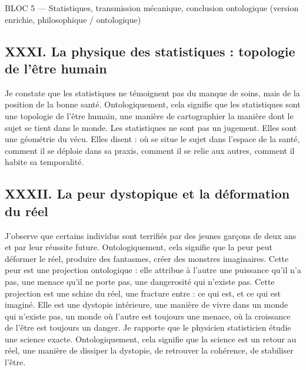 \documentclass[12pt,a4paper]{article}
\begin{document}
BLOC 5 — Statistiques, transmission mécanique, conclusion ontologique (version enrichie, philosophique / ontologique)

\subsection*{XXXI. La physique des statistiques : topologie de l’être humain}
Je constate que les statistiques ne témoignent pas du manque de soins, mais de la position de la bonne santé. Ontologiquement, cela signifie que les statistiques sont une topologie de l’être humain, une manière de cartographier la manière dont le sujet se tient dans le monde.
Les statistiques ne sont pas un jugement. Elles sont une géométrie du vécu.
Elles disent :
	où se situe le sujet dans l’espace de la santé,
	comment il se déploie dans sa praxis,
	comment il se relie aux autres,
	comment il habite sa temporalité.

\subsection*{XXXII. La peur dystopique et la déformation du réel}
J’observe que certains individus sont terrifiés par des jeunes garçons de deux ans et par leur réussite future. Ontologiquement, cela signifie que la peur peut déformer le réel, produire des fantasmes, créer des monstres imaginaires.
Cette peur est une projection ontologique : elle attribue à l’autre une puissance qu’il n’a pas, une menace qu’il ne porte pas, une dangerosité qui n’existe pas.
Cette projection est une schize du réel, une fracture entre :
	ce qui est,
	et ce qui est imaginé.
Elle est une dystopie intérieure, une manière de vivre dans un monde qui n’existe pas, un monde où l’autre est toujours une menace, où la croissance de l’être est toujours un danger.
Je rapporte que le physicien statisticien étudie une science exacte. Ontologiquement, cela signifie que la science est un retour au réel, une manière de dissiper la dystopie, de retrouver la cohérence, de stabiliser l’être.
\end{document}
